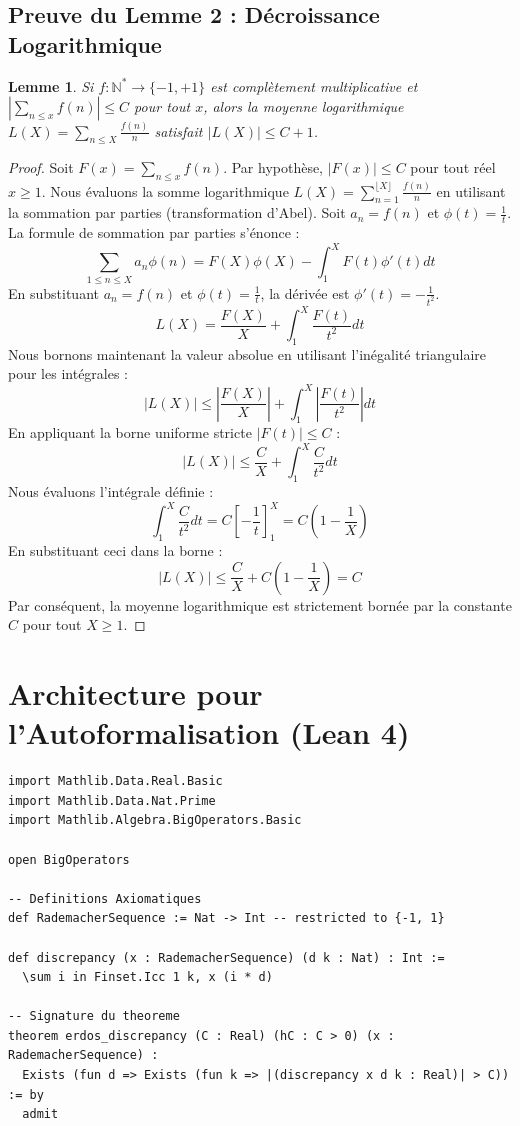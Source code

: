 \documentclass[11pt,a4paper]{article}
\newtheorem{lemma}[theorem]{Lemme}
\begin{document}
\subsection{Preuve du Lemme 2 : D\'ecroissance Logarithmique}
\begin{lemma}
Si $f : \mathbb{N}^* \to \{-1, +1\}$ est compl\`etement multiplicative et $|\sum_{n \le x} f(n)| \le C$ pour tout $x$, alors la moyenne logarithmique $L(X) = \sum_{n \le X} \frac{f(n)}{n}$ satisfait $|L(X)| \le C + 1$.
\end{lemma}
\begin{proof}
Soit $F(x) = \sum_{n \le x} f(n)$. Par hypoth\`ese, $|F(x)| \le C$ pour tout r\'eel $x \ge 1$.
Nous \'evaluons la somme logarithmique $L(X) = \sum_{n=1}^{\lfloor X \rfloor} \frac{f(n)}{n}$ en utilisant la sommation par parties (transformation d'Abel).
Soit $a_n = f(n)$ et $\phi(t) = \frac{1}{t}$.
La formule de sommation par parties s'\'enonce :
$$ \sum_{1 \le n \le X} a_n \phi(n) = F(X)\phi(X) - \int_{1}^{X} F(t) \phi'(t) dt $$
En substituant $a_n = f(n)$ et $\phi(t) = \frac{1}{t}$, la d\'eriv\'ee est $\phi'(t) = -\frac{1}{t^2}$.
$$ L(X) = \frac{F(X)}{X} + \int_{1}^{X} \frac{F(t)}{t^2} dt $$
Nous bornons maintenant la valeur absolue en utilisant l'in\'egalit\'e triangulaire pour les int\'egrales :
$$ |L(X)| \le \left| \frac{F(X)}{X} \right| + \int_{1}^{X} \left| \frac{F(t)}{t^2} \right| dt $$
En appliquant la borne uniforme stricte $|F(t)| \le C$ :
$$ |L(X)| \le \frac{C}{X} + \int_{1}^{X} \frac{C}{t^2} dt $$
Nous \'evaluons l'int\'egrale d\'efinie :
$$ \int_{1}^{X} \frac{C}{t^2} dt = C \left[ -\frac{1}{t} \right]_{1}^{X} = C \left( 1 - \frac{1}{X} \right) $$
En substituant ceci dans la borne :
$$ |L(X)| \le \frac{C}{X} + C \left( 1 - \frac{1}{X} \right) = C $$
Par cons\'equent, la moyenne logarithmique est strictement born\'ee par la constante $C$ pour tout $X \ge 1$.
\end{proof}

\section{Architecture pour l'Autoformalisation (Lean 4)}

\begin{lstlisting}[basicstyle=\ttfamily\small, breaklines=true]
import Mathlib.Data.Real.Basic
import Mathlib.Data.Nat.Prime
import Mathlib.Algebra.BigOperators.Basic

open BigOperators

-- Definitions Axiomatiques
def RademacherSequence := Nat -> Int -- restricted to {-1, 1}

def discrepancy (x : RademacherSequence) (d k : Nat) : Int :=
  \sum i in Finset.Icc 1 k, x (i * d)

-- Signature du theoreme
theorem erdos_discrepancy (C : Real) (hC : C > 0) (x : RademacherSequence) :
  Exists (fun d => Exists (fun k => |(discrepancy x d k : Real)| > C)) := by
  admit
\end{lstlisting}
\end{document}
